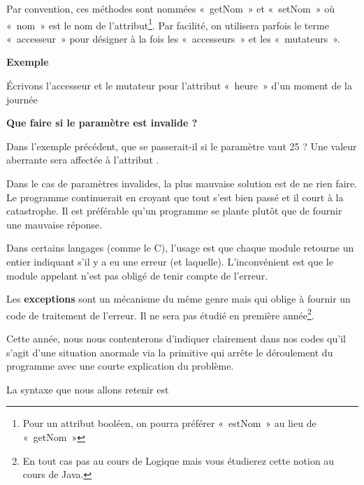 Par convention, ces méthodes sont nommées «~getNom~» et «~setNom~» où
«~nom~» est le nom de
l'attribut\footnote{{Pour un
attribut booléen, on pourra préférer «~estNom~» au lieu de
«~getNom~»}}. Par facilité, on utilisera parfois le terme «~accesseur~»
pour désigner à la fois les «~accesseurs~» et les «~mutateurs~».

{\bfseries
Exemple}

Écrivons l'accesseur et le mutateur pour
l'attribut «~heure~» d'un moment de
la journée


\bigskip


\bigskip

{\sffamily\bfseries\upshape
Que faire si le paramètre est invalide ? }

Dans l'exemple précédent, que se passerait-il si le
paramètre  vaut 25 ? Une valeur aberrante sera
affectée à l'attribut .

Dans le cas de paramètres invalides, la plus mauvaise solution est de ne
rien faire. Le programme continuerait en croyant que tout s’est bien
passé et il court à la catastrophe. Il est préférable qu’un programme
se plante plutôt que de fournir une mauvaise réponse. 

Dans certains langages (comme le C), l’usage est que chaque module
retourne un entier indiquant s'il y a eu une erreur
(et laquelle). L’inconvénient est que le module appelant n’est pas
obligé de tenir compte de l’erreur.

Les \textbf{exceptions} sont un mécanisme du même genre mais qui oblige
à fournir un code de traitement de l’erreur. Il ne sera pas étudié en
première année\footnote{{En tout cas pas au
cours de Logique mais vous étudierez cette notion au cours de Java.}}.

Cette année, nous nous contenterons d'indiquer
clairement dans nos codes qu'il
s'agit d'une situation anormale via
la primitive  qui arrête le déroulement du
programme avec une courte explication du problème.

La syntaxe que nous allons retenir est

